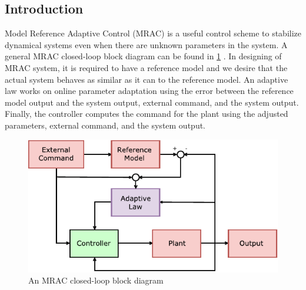 \subsection{Introduction}
Model Reference Adaptive Control (MRAC) is a useful control scheme to stabilize dynamical systems even when there are unknown parameters in the system. A general MRAC closed-loop block diagram can be found in \ref{MRAC_blockdiagram} \cite{Lavretsky2013}. In designing of MRAC system, it is required to have a reference model and we desire that the actual system behaves as similar as it can to the reference model. An adaptive law works on online parameter adaptation using the error between the reference model output and the system output, external command, and the system output. Finally, the controller computes the command for the plant using the adjusted parameters, external command, and the system output. 
\begin{figure}[t]
	\centering
	\includegraphics[width = 5in]{images/chapter2/MRAC.pdf}
	\caption{An MRAC closed-loop block diagram}
	\label{MRAC_blockdiagram}
\end{figure}
